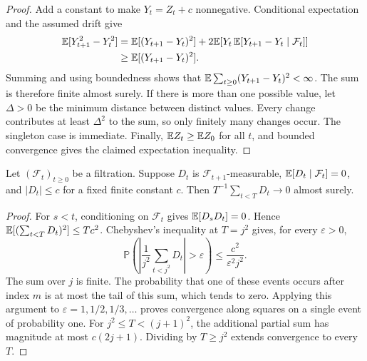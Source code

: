 \begin{proof}
Add a constant to make $Y_t=Z_t+c$ nonnegative. Conditional expectation
and the assumed drift give
\[
 \begin{split}
 \mathbb E[Y_{t+1}^2-Y_t^2]
 &=\mathbb E[(Y_{t+1}-Y_t)^2]
   +2\mathbb E\!\left[Y_t\,\mathbb E[Y_{t+1}-Y_t\mid\mathcal F_t]\right]\\
 &\ge\mathbb E[(Y_{t+1}-Y_t)^2].
 \end{split}
\]
Summing and using boundedness shows that
$\mathbb E\sum_{t\ge0}(Y_{t+1}-Y_t)^2<\infty$. The sum is therefore finite
almost surely. If there is more than one possible value, let $\Delta>0$
be the minimum distance between distinct values. Every change contributes
at least $\Delta^2$ to the sum, so only finitely many changes occur.
The singleton case is immediate. Finally, $\mathbb E Z_t\ge\mathbb E Z_0$ for all
$t$, and bounded convergence gives the claimed expectation inequality.
\end{proof}

\begin{lemma}
\label{lem:bounded-martingale-average}
Let $(\mathcal F_t)_{t\ge0}$ be a filtration. Suppose $D_t$ is
$\mathcal F_{t+1}$-measurable,
$\mathbb E[D_t\mid\mathcal F_t]=0$, and $|D_t|\le c$ for a fixed finite
constant $c$. Then $T^{-1}\sum_{t<T}D_t\to0$ almost surely.
\end{lemma}

\begin{proof}
For $s<t$, conditioning on $\mathcal F_t$ gives $\mathbb E[D_sD_t]=0$.
Hence $\mathbb E[(\sum_{t<T}D_t)^2]\le Tc^2$. Chebyshev's inequality at
$T=j^2$ gives, for every $\varepsilon>0$,
\[
 \mathbb P\!\left(\left|\frac1{j^2}\sum_{t<j^2}D_t\right|>
          \varepsilon\right)
 \le\frac{c^2}{\varepsilon^2j^2}.
\]
The sum over $j$ is finite. The probability that one of these events
occurs after index $m$ is at most the tail of this sum, which tends to
zero. Applying this argument to $\varepsilon=1,1/2,1/3,\ldots$ proves
convergence along squares on a single event of probability one.
For $j^2\le T<(j+1)^2$, the additional partial sum has magnitude at
most $c(2j+1)$. Dividing by $T\ge j^2$ extends convergence to every
$T$.
\end{proof}

